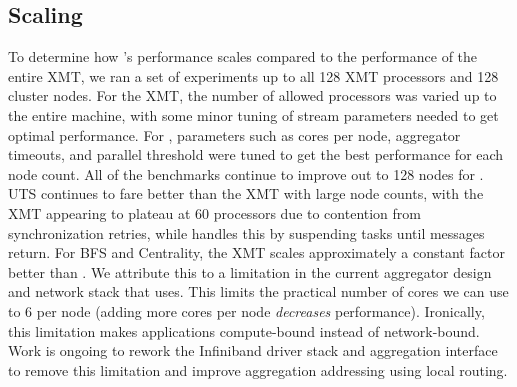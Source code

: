 {\subsection{Scaling}
%
%
To determine how \Grappa's performance scales compared to the performance of the entire XMT, we ran a set of experiments up to all 128 XMT processors and 128 cluster nodes. For the XMT, the number of allowed processors was varied up to the entire machine, with some minor tuning of stream parameters needed to get optimal performance. For \Grappa, parameters such as cores per node, aggregator timeouts, and parallel threshold were tuned to get the best performance for each node count. All of the benchmarks continue to improve out to 128 nodes for \Grappa. UTS continues to fare better than the XMT with large node counts, with the XMT appearing to plateau at 60 processors due to contention from synchronization retries, while \Grappa handles this by suspending tasks until messages return. For BFS and Centrality, the XMT scales approximately a constant factor better than \Grappa. We attribute this to a limitation in the current aggregator design and network stack that \Grappa uses.  This limits the practical number of cores we can use to 6 per node (adding more cores per node \emph{decreases\/} performance).  Ironically, this limitation makes \Grappa applications compute-bound instead of network-bound.  Work is ongoing to rework the Infiniband driver stack and aggregation interface to remove this limitation and improve aggregation addressing using local routing.

}
